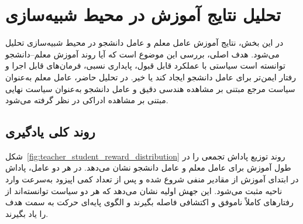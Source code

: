 \section{تحلیل نتایج آموزش در محیط شبیه‌سازی}
\label{sec:training_results_analysis}

در این بخش، نتایج آموزش عامل معلم و عامل دانشجو در محیط شبیه‌سازی تحلیل می‌شود. هدف اصلی، بررسی این موضوع است که آیا روند آموزش معلم--دانشجو توانسته است سیاستی با عملکرد قابل قبول، پایداری نسبی، فرمان‌های قابل اجرا و رفتار ایمن‌تر برای عامل دانشجو ایجاد کند یا خیر. در تحلیل حاضر، عامل معلم به‌عنوان سیاست مرجع مبتنی بر مشاهده هندسی دقیق و عامل دانشجو به‌عنوان سیاست نهایی مبتنی بر مشاهده ادراکی در نظر گرفته می‌شود.

\subsection{روند کلی یادگیری}
\label{subsec:overall_training_trend}

شکل~\ref{fig:teacher_student_reward_distribution} روند توزیع پاداش تجمعی را در طول آموزش برای عامل معلم و عامل دانشجو نشان می‌دهد. در هر دو عامل، پاداش در ابتدای آموزش از مقادیر منفی شروع شده و پس از تعداد کمی اپیزود به‌سرعت وارد ناحیه مثبت می‌شود. این جهش اولیه نشان می‌دهد که هر دو سیاست توانسته‌اند از رفتارهای کاملاً ناموفق و اکتشافی فاصله بگیرند و الگوی پایه‌ای حرکت به سمت هدف را یاد بگیرند.

